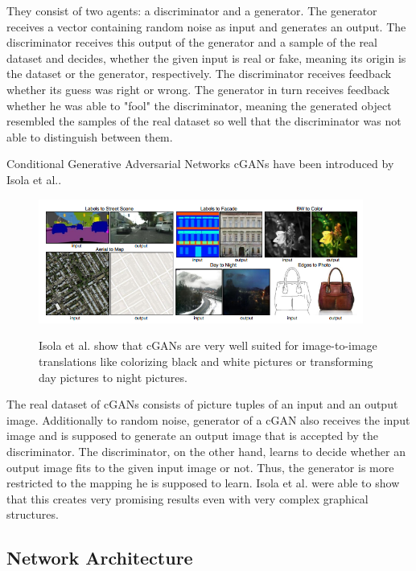 \documentclass[a4paper,12pt,pagesize,headsepline,bibtotoc,titlepage]{scrartcl}
\begin{document}
They consist of two agents: a discriminator and a generator.
The generator receives a vector containing random noise as input and generates an output.
The discriminator receives this output of the generator and a sample of the real dataset and decides, whether the given input is real or fake, meaning its origin is the dataset or the generator, respectively.
The discriminator receives feedback whether its guess was right or wrong.
The generator in turn receives feedback whether he was able to "fool" the discriminator, meaning the generated object resembled the samples of the real dataset so well that the discriminator was not able to distinguish between them.

Conditional Generative Adversarial Networks cGANs have been introduced by Isola et al.\cite{cGANs}.
\begin{figure}[ht]
\begin{center}
\includegraphics*[width=0.95\textwidth]{images/conditional-adversarial-network.png}\\
\caption{Isola et al. show that cGANs are very well suited for image-to-image translations like colorizing black and white pictures or transforming day pictures to night pictures.}
\label{fig:can}
\end{center}
\end{figure}

The real dataset of cGANs consists of picture tuples of an input and an output image.
Additionally to random noise, generator of a cGAN also receives the input image and is supposed to generate an output image that is accepted by the discriminator.
The discriminator, on the other hand, learns to decide whether an output image fits to the given input image or not.
Thus, the generator is more restricted to the mapping he is supposed to learn.
Isola et al. were able to show that this creates very promising results even with very complex graphical structures.

\subsection{Network Architecture}
\end{document}

